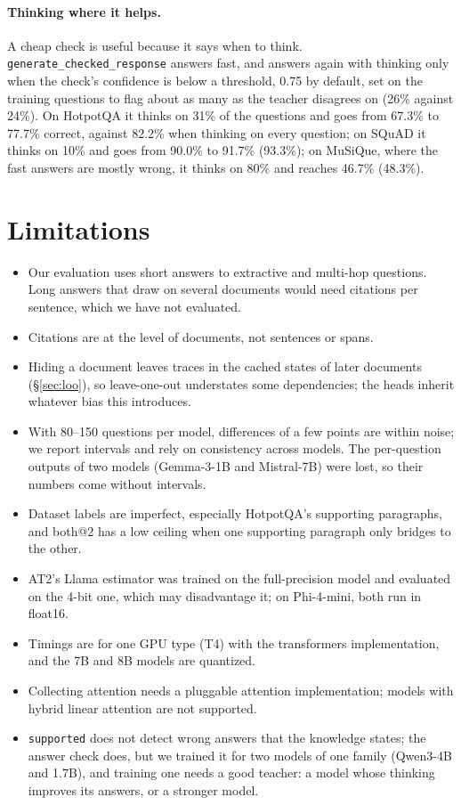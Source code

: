 \documentclass[11pt]{article}
\begin{document}
\paragraph{Thinking where it helps.} A cheap check is useful because it says when to think. \texttt{generate\_checked\allowbreak\_response} answers fast, and answers again with thinking only when the check's confidence is below a threshold, 0.75 by default, set on the training questions to flag about as many as the teacher disagrees on (26\% against 24\%). On HotpotQA it thinks on 31\% of the questions and goes from 67.3\% to 77.7\% correct, against 82.2\% when thinking on every question; on SQuAD it thinks on 10\% and goes from 90.0\% to 91.7\% (93.3\%); on MuSiQue, where the fast answers are mostly wrong, it thinks on 80\% and reaches 46.7\% (48.3\%).

\section{Limitations}
\label{sec:limitations}

\begin{itemize}
\item Our evaluation uses short answers to extractive and multi-hop questions. Long answers that draw on several documents would need citations per sentence, which we have not evaluated.
\item Citations are at the level of documents, not sentences or spans.
\item Hiding a document leaves traces in the cached states of later documents (\S\ref{sec:loo}), so leave-one-out understates some dependencies; the heads inherit whatever bias this introduces.
\item With 80--150 questions per model, differences of a few points are within noise; we report intervals and rely on consistency across models. The per-question outputs of two models (Gemma-3-1B and Mistral-7B) were lost, so their numbers come without intervals.
\item Dataset labels are imperfect, especially HotpotQA's supporting paragraphs, and both@2 has a low ceiling when one supporting paragraph only bridges to the other.
\item AT2's Llama estimator was trained on the full-precision model and evaluated on the 4-bit one, which may disadvantage it; on Phi-4-mini, both run in float16.
\item Timings are for one GPU type (T4) with the transformers implementation, and the 7B and 8B models are quantized.
\item Collecting attention needs a pluggable attention implementation; models with hybrid linear attention are not supported.
\item \texttt{supported} does not detect wrong answers that the knowledge states; the answer check does, but we trained it for two models of one family (Qwen3-4B and 1.7B), and training one needs a good teacher: a model whose thinking improves its answers, or a stronger model.
\end{itemize}
\end{document}
